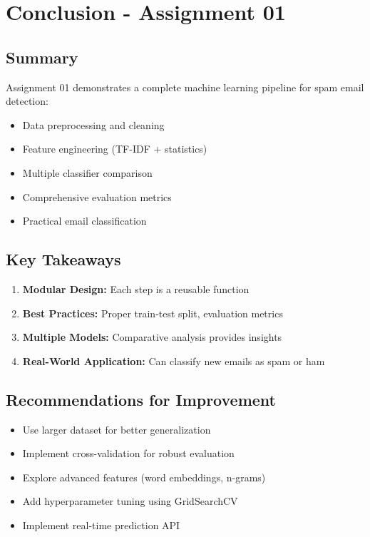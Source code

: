 \documentclass[14pt,a4paper]{report}
\begin{document}
\section{Conclusion - Assignment 01}

\subsection{Summary}

Assignment 01 demonstrates a complete machine learning pipeline for spam email detection:
\begin{itemize}
    \item[\checkmark] Data preprocessing and cleaning
    \item[\checkmark] Feature engineering (TF-IDF + statistics)
    \item[\checkmark] Multiple classifier comparison
    \item[\checkmark] Comprehensive evaluation metrics
    \item[\checkmark] Practical email classification
\end{itemize}

\subsection{Key Takeaways}

\begin{enumerate}
    \item \textbf{Modular Design:} Each step is a reusable function
    \item \textbf{Best Practices:} Proper train-test split, evaluation metrics
    \item \textbf{Multiple Models:} Comparative analysis provides insights
    \item \textbf{Real-World Application:} Can classify new emails as spam or ham
\end{enumerate}

\subsection{Recommendations for Improvement}

\begin{itemize}
    \item Use larger dataset for better generalization
    \item Implement cross-validation for robust evaluation
    \item Explore advanced features (word embeddings, n-grams)
    \item Add hyperparameter tuning using GridSearchCV
    \item Implement real-time prediction API
\end{itemize}
\end{document}
